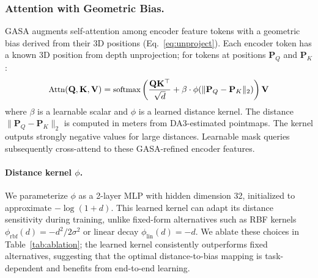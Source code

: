 \subsubsection{Attention with Geometric Bias.}
GASA augments self-attention among encoder feature tokens with a geometric bias derived from their 3D positions (Eq.~\cref{eq:unproject}). Each encoder token has a known 3D position from depth unprojection; for tokens at positions $\mathbf{P}_Q$ and $\mathbf{P}_K$:
\begin{equation}
\small
\text{Attn}(\mathbf{Q}, \mathbf{K}, \mathbf{V}) = \text{softmax}\left( \frac{\mathbf{Q}\mathbf{K}^\top}{\sqrt{d}} + \beta \cdot \phi(\|\mathbf{P}_Q - \mathbf{P}_K\|_2) \right) \mathbf{V}
\label{eq:gasa}
\end{equation}
where $\beta$ is a learnable scalar and $\phi$ is a learned distance kernel. The distance $\|\mathbf{P}_Q - \mathbf{P}_K\|_2$ is computed in meters from DA3-estimated pointmaps. The kernel outputs strongly negative values for large distances. Learnable mask queries subsequently cross-attend to these GASA-refined encoder features.

\paragraph{Distance kernel $\phi$.} We parameterize $\phi$ as a 2-layer MLP with hidden dimension 32, initialized to approximate $-\log(1 + d)$. This learned kernel can adapt its distance sensitivity during training, unlike fixed-form alternatives such as RBF kernels $\phi_{\text{rbf}}(d) = -d^2 / 2\sigma^2$ or linear decay $\phi_{\text{lin}}(d) = -d$. We ablate these choices in Table~\ref{tab:ablation}; the learned kernel consistently outperforms fixed alternatives, suggesting that the optimal distance-to-bias mapping is task-dependent and benefits from end-to-end learning.



